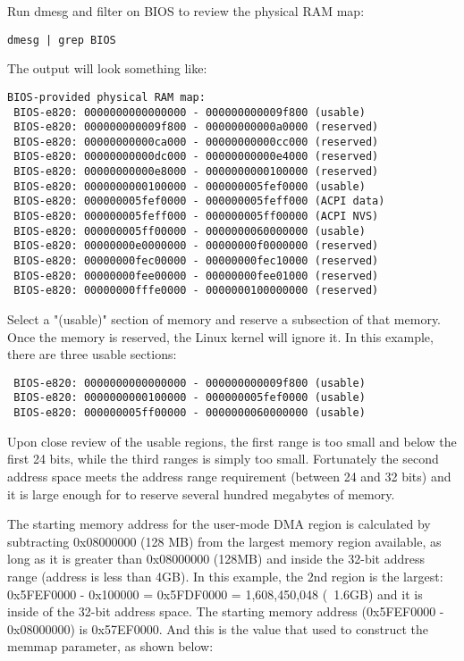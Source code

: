 \begin{flushleft}
Run dmesg and filter on BIOS to review the physical RAM map: \\
\begin{lstlisting}
dmesg | grep BIOS
\end{lstlisting}
The output will look something like:
\begin{lstlisting}
BIOS-provided physical RAM map:
 BIOS-e820: 0000000000000000 - 000000000009f800 (usable)
 BIOS-e820: 000000000009f800 - 00000000000a0000 (reserved)
 BIOS-e820: 00000000000ca000 - 00000000000cc000 (reserved)
 BIOS-e820: 00000000000dc000 - 00000000000e4000 (reserved)
 BIOS-e820: 00000000000e8000 - 0000000000100000 (reserved)
 BIOS-e820: 0000000000100000 - 000000005fef0000 (usable)
 BIOS-e820: 000000005fef0000 - 000000005feff000 (ACPI data)
 BIOS-e820: 000000005feff000 - 000000005ff00000 (ACPI NVS)
 BIOS-e820: 000000005ff00000 - 0000000060000000 (usable)
 BIOS-e820: 00000000e0000000 - 00000000f0000000 (reserved)
 BIOS-e820: 00000000fec00000 - 00000000fec10000 (reserved)
 BIOS-e820: 00000000fee00000 - 00000000fee01000 (reserved)
 BIOS-e820: 00000000fffe0000 - 0000000100000000 (reserved)
\end{lstlisting}

Select a "(usable)" section of memory and reserve a subsection of that memory. Once the memory is reserved, the Linux kernel will ignore it. In this example, there are three usable sections:\\
\begin{lstlisting}
 BIOS-e820: 0000000000000000 - 000000000009f800 (usable)
 BIOS-e820: 0000000000100000 - 000000005fef0000 (usable)
 BIOS-e820: 000000005ff00000 - 0000000060000000 (usable)
\end{lstlisting}

Upon close review of the usable regions, the first range is too small and below the first 24 bits, while the third ranges is simply too small. Fortunately the second address space meets the address range requirement (between 24 and 32 bits) and it is large enough for to reserve several hundred megabytes of memory. \\ \medskip

The starting memory address for the user-mode DMA region is calculated by subtracting 0x08000000 (128 MB) from the largest memory region available, as long as it is greater than 0x08000000 (128MB) and inside the 32-bit address range (address is less than 4GB). In this example, the 2nd region is the largest: 0x5FEF0000 - 0x100000 = 0x5FDF0000 = 1,608,450,048 (~1.6GB) and it is inside of the 32-bit address space. The starting memory address (0x5FEF0000 - 0x08000000) is 0x57EF0000. And this is the value that used to construct the memmap parameter, as shown below:\\ \medskip


\end{flushleft}
